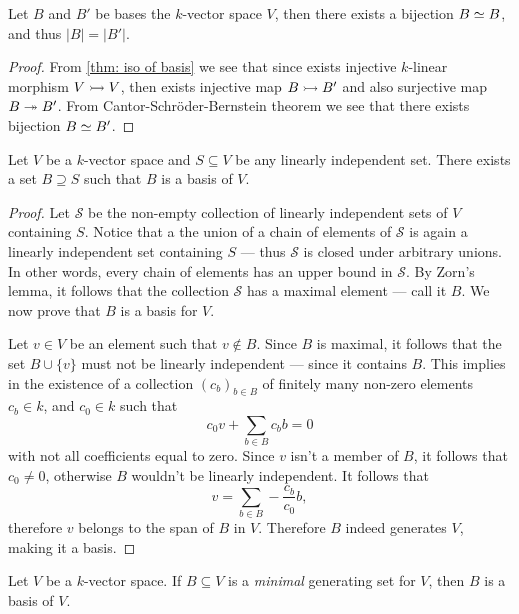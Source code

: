 \begin{lemma}\label{lem:basis-have-equal-cardinality}
Let \(B\) and \(B'\) be bases the \(k\)-vector space \(V\), then there exists
a bijection \(B \simeq B\), and thus \(|B| = |B'|\).
\end{lemma}

\begin{proof}
From \cref{thm: iso of basis} we see that since exists injective
\(k\)-linear morphism \(V \rightarrowtail V\), then exists injective map \(B
\rightarrowtail B'\) and also surjective map \(B \twoheadrightarrow B'\). From
Cantor-Schröder-Bernstein theorem we see that there exists bijection \(B \simeq
B'\).
\end{proof}

\begin{proposition}\label{prop: li to basis}
Let \(V\) be a \(k\)-vector space and \(S \subseteq V\) be any linearly
independent set. There exists a set \(B \supseteq S\) such that \(B\) is a
basis of \(V\).
\end{proposition}

\begin{proof}
Let \(\mathcal{S}\) be the non-empty collection of linearly independent sets of
\(V\) containing \(S\). Notice that a the union of a chain of elements of
\(\mathcal{S}\) is again a linearly independent set containing \(S\) --- thus
\(\mathcal{S}\) is closed under arbitrary unions. In other words, every chain of
elements has an upper bound in \(\mathcal{S}\). By Zorn's lemma, it follows that
the collection \(\mathcal{S}\) has a maximal element --- call it \(B\). We now
prove that \(B\) is a basis for \(V\).

Let \(v \in V\) be an element such that \(v \notin B\). Since \(B\) is maximal,
it follows that the set \(B \cup \{v\}\) must not be linearly independent ---
since it contains \(B\). This implies in the existence of a collection
\((c_b)_{b \in B}\) of finitely many non-zero elements \(c_b \in k\), and \(c_0
\in k\) such that
\[
c_0 v + \sum_{b \in B} c_b b = 0
\]
with not all coefficients equal to zero. Since \(v\) isn't a member of \(B\),
it follows that \(c_0 \neq 0\), otherwise \(B\) wouldn't be linearly
independent. It follows that
\[
v = \sum_{b \in B} - \frac{c_{b}}{c_{0}} b,
\]
therefore \(v\) belongs to the span of \(B\) in \(V\). Therefore \(B\) indeed
generates \(V\), making it a basis.
\end{proof}

\begin{lemma}
\label{lem:minimal-generating-is-basis}
Let \(V\) be a \(k\)-vector space. If \(B \subseteq V\) is a \emph{minimal}
generating set for \(V\), then \(B\) is a basis of \(V\).
\end{lemma}

